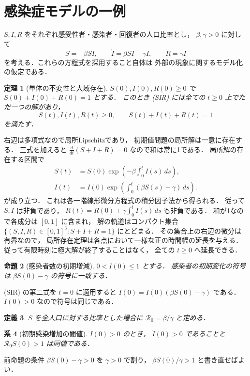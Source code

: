 \documentclass[a5paper,10pt,onecolumn]{jsarticle}
\makeatletter
\theoremstyle{mathnotetheorem}
\newtheorem{theorem}{定理}[section]
\newtheorem{definition}[theorem]{定義}
\newtheorem{proposition}[theorem]{命題}
\newtheorem{corollary}[theorem]{系}
\renewcommand{\proofname}{証明}
\renewenvironment{proof}[1][\proofname]{%
  \par\pushQED{\qed}\normalfont\topsep4\p@\@plus2\p@\relax
  \trivlist\item[\hskip\labelsep\bfseries #1]\ignorespaces
}{\popQED\endtrivlist\@endpefalse}
\makeatother
\begin{document}
\section{感染症モデルの一例}
$S,I,R$ をそれぞれ感受性者・感染者・回復者の人口比率とし，
$\beta,\gamma>0$ に対して
\[
 \dot S=-\beta SI,\qquad
 \dot I=\beta SI-\gamma I,\qquad
 \dot R=\gamma I
 \tag{SIR}
\]
を考える．これらの方程式を採用すること自体は
外部の現象に関するモデル化の仮定である．
\begin{theorem}[単体の不変性と大域存在]\label{thm:sir}
$S(0),I(0),R(0)\ge0$ で
$S(0)+I(0)+R(0)=1$ とする．
このとき (SIR) には全ての $t\ge0$ 上でただ一つの解があり，
\[
 S(t),I(t),R(t)\ge0,\qquad S(t)+I(t)+R(t)=1
\]
を満たす．
\end{theorem}
\begin{proof}
右辺は多項式なので局所Lipschitzであり，
初期値問題の局所解は一意に存在する．
三式を加えると
$\frac d{dt}(S+I+R)=0$ なので和は常に1である．
局所解の存在する区間で
\[
 \begin{aligned}
 S(t)&=S(0)\exp\left(-\beta\int_0^t I(s)\,ds\right),\\
 I(t)&=I(0)\exp\left(\int_0^t(\beta S(s)-\gamma)\,ds\right).
 \end{aligned}
\]
が成り立つ．
これは各一階線形微分方程式の積分因子法から得られる．
従って $S,I$ は非負であり，
$R(t)=R(0)+\gamma\int_0^t I(s)\,ds$ も非負である．
和が1なので各成分は $[0,1]$ に含まれ，
解の軌道はコンパクト集合
$\{(S,I,R)\in[0,1]^3:S+I+R=1\}$ にとどまる．
その集合上の右辺の微分は有界なので，
局所存在定理は各点において一様な正の時間幅の延長を与える．
従って有限時刻に極大解が終了することはなく，
全ての $t\ge0$ へ延長できる．
\end{proof}
\begin{proposition}[感染者数の初期増減]
$0<I(0)\le1$ とする．
感染者の初期変化の符号は
$\beta S(0)-\gamma$ の符号に一致する．
\end{proposition}
\begin{proof}
(SIR) の第二式を $t=0$ に適用すると
$\dot I(0)=I(0)(\beta S(0)-\gamma)$ である．
$I(0)>0$ なので符号は同じである．
\end{proof}
\begin{definition}
$S$ を全人口に対する比率とした場合に
$\mathcal R_0=\beta/\gamma$ と定める．
\end{definition}
\begin{corollary}[初期感染増加の閾値]
$I(0)>0$ のとき，
$\dot I(0)>0$ であることと
$\mathcal R_0 S(0)>1$ は同値である．
\end{corollary}
\begin{proof}
前命題の条件
$\beta S(0)-\gamma>0$ を $\gamma>0$ で割り，
$\beta S(0)/\gamma>1$ と書き直せばよい．
\end{proof}
\end{document}
